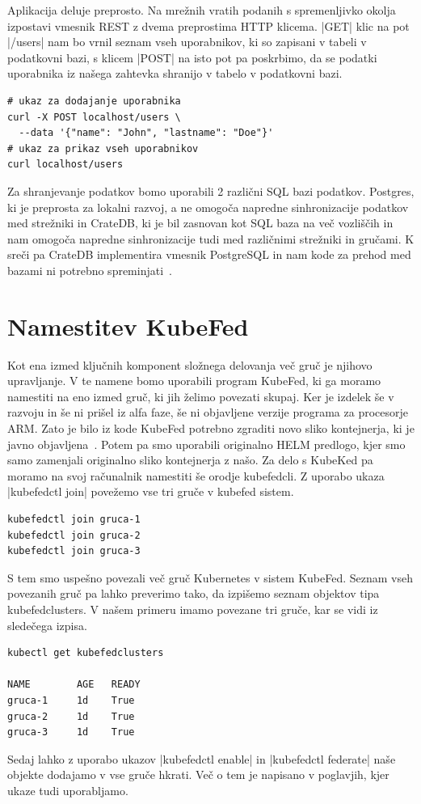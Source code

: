 \documentclass[a4paper, 12pt]{book}
\begin{document}
Aplikacija deluje preprosto.
Na mrežnih vratih podanih s spremenljivko okolja izpostavi vmesnik REST z dvema preprostima HTTP klicema.
\spverb|GET| klic na pot \spverb|/users| nam bo vrnil seznam vseh uporabnikov, ki so zapisani v tabeli v podatkovni bazi, s klicem \spverb|POST| na isto pot pa poskrbimo, da se podatki uporabnika iz našega zahtevka shranijo v tabelo v podatkovni bazi.
\begin{verbatim}
# ukaz za dodajanje uporabnika
curl -X POST localhost/users \
  --data '{"name": "John", "lastname": "Doe"}'
# ukaz za prikaz vseh uporabnikov
curl localhost/users
\end{verbatim}

Za shranjevanje podatkov bomo uporabili 2 različni SQL bazi podatkov.
Postgres, ki je preprosta za lokalni razvoj, a ne omogoča napredne sinhronizacije podatkov med strežniki in CrateDB, ki je bil zasnovan kot SQL baza na več vozliščih in nam omogoča napredne sinhronizacije tudi med različnimi strežniki in gručami.
K sreči pa CrateDB implementira vmesnik PostgreSQL in nam kode za prehod med bazami ni potrebno spreminjati~\cite{cratedb}.
\section{Namestitev KubeFed}
Kot ena izmed ključnih komponent složnega delovanja več gruč je njihovo upravljanje.
V te namene bomo uporabili program KubeFed, ki ga moramo namestiti na eno izmed gruč, ki jih želimo povezati skupaj.
Ker je izdelek še v razvoju in še ni prišel iz alfa faze, še ni objavljene verzije programa za procesorje ARM.
Zato je bilo iz kode KubeFed potrebno zgraditi novo sliko kontejnerja, ki je javno objavljena~\cite{docker-kubefed}.
Potem pa smo uporabili originalno HELM predlogo, kjer smo samo zamenjali originalno sliko kontejnerja z našo.
Za delo s KubeKed pa moramo na svoj računalnik namestiti še orodje kubefedcli.
Z uporabo ukaza \spverb|kubefedctl join| povežemo vse tri gruče v kubefed sistem.
\begin{verbatim}
kubefedctl join gruca-1
kubefedctl join gruca-2
kubefedctl join gruca-3
\end{verbatim}
S tem smo uspešno povezali več gruč Kubernetes v sistem KubeFed.
Seznam vseh povezanih gruč pa lahko preverimo tako, da izpišemo seznam objektov tipa kubefedclusters. 
V našem primeru imamo povezane tri gruče, kar se vidi iz sledečega izpisa.
\begin{verbatim}
kubectl get kubefedclusters

NAME        AGE   READY
gruca-1     1d    True
gruca-2     1d    True
gruca-3     1d    True
\end{verbatim}
Sedaj lahko z uporabo ukazov \spverb|kubefedctl enable| in \spverb|kubefedctl federate| naše objekte dodajamo v vse gruče hkrati.
Več o tem je napisano v poglavjih, kjer ukaze tudi uporabljamo.
\end{document}
